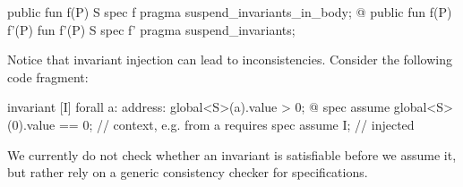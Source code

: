 \begin{Move}
  public fun f(P) { S }
  spec f { pragma suspend_invariants_in_body; }
  @\transform@
  public fun f(P) { f'(P) }
  fun f'(P) { S } spec f' { pragma suspend_invariants; }
\end{Move}





Notice that invariant injection can lead to inconsistencies. Consider the following
code fragment:

\begin{Move}
  invariant [I] forall a: address: global<S>(a).value > 0;
  @\transform@
  spec assume global<S>(0).value == 0;  // context, e.g. from a requires
  spec assume I;                        // injected
\end{Move}

\noindent We currently do not check whether an invariant is satisfiable
before we assume it, but rather rely on a generic consistency checker for
specifications.


